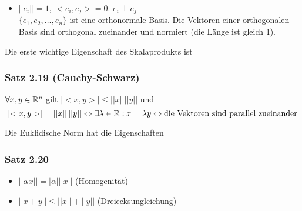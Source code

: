 \begin{definition}{2.17}
\begin{itemize}
\begin{center}
\end{center}

    \item $\left|\left|e_i\right|\right|=1$, $<e_i,e_j>=0$. $e_i \perp e_j$\\
$\{e_1,e_2,\dots,e_n\}$ ist eine orthonormale Basis. Die Vektoren einer orthogonalen Basis sind orthogonal zueinander und normiert (die Länge ist gleich 1).
\end{itemize}
\end{definition}
Die erste wichtige Eigenschaft des Skalaprodukts ist
\subsubsection*{Satz 2.19 (Cauchy-Schwarz)}
$\forall x,y\in\mathbb{R}^n$ gilt $\left| <x,y>\right| \leq \left|\left| x\right|\right| \left|\left| y\right|\right|$ und \[\left| <x,y>\right|=\left|\left| x\right|\right| \left|\left| y\right|\right|\Leftrightarrow \exists\lambda\in\mathbb{R}: x=\lambda y\Leftrightarrow \text{die Vektoren sind parallel zueinander}\]

Die Euklidische Norm hat die Eigenschaften
\subsubsection*{Satz 2.20}
\begin{itemize}
    \item $\left|\left| \alpha x\right|\right|=\left|\alpha\right|\left|\left| x\right|\right|$ (Homogenität)
    \item $\left|\left| x+y\right|\right| \leq \left|\left| x\right|\right| + \left|\left| y\right|\right|$ (Dreiecksungleichung)
\end{itemize}


